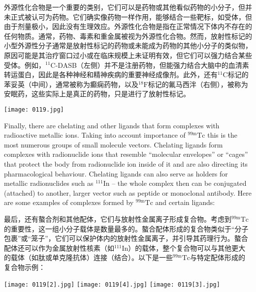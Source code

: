 \documentclass[dvipsnames, svgnames,a4paper,11pt]{article}
\begin{document}
外源性化合物是一个重要的类别，它们可以是药物或其他看似药物的小分子，但并未正式被认可为药物。它们确实像药物一样作用，能够结合一些靶标，如受体，但由于剂量极小，因此没有生理效应。外源性化合物是指在正常情况下体内不存在的任何物质。通常，药物、毒素和重金属被视为外源性化合物。然而，放射性标记的小型外源性分子通常是放射性标记的药物或未能成为药物的其他小分子的类似物，原因可能是其治疗窗口过小或在临床规模上未证明有效，但它们可以强力结合某些受体。例如，${}^{11}\mathrm{C}$-DASB（左侧）并不是注册药物，但能强力结合大脑中的血清素转运蛋白，因此是各种神经和精神疾病的重要神经成像剂。此外，还有${}^{11}\mathrm{C}$标记的苯妥英（中间），通常被称为癫痫药物，以及${}^{18}\mathrm{F}$标记的氟马西泮（右侧），被称为安眠药，这些实际上是真正的药物，只是进行了放射性标记。

\begin{figure*}[h]
	\centering
    \texttt{[image: 0119.jpg]}
\end{figure*}

Finally, there are chelating and other ligands that form complexes with radioactive
metallic ions. Taking into account importance of ${}^\mathrm{99m}\mathrm{Tc}$ this is the most numerous
groups of small molecule vectors. Chelating ligands form complexes with
radionuclide ions that resemble “molecular envelopes” or “cages” that protect the
body from radionuclide ion inside of it and are also directing its pharmacological
behaviour. Chelating ligands can also serve as holders for metallic radionuclides
such as ${}^{111}\mathrm{In}$ – the whole complex then can be conjugated (attached) to another,
larger vector such as peptide or monoclonal antibody. Here are some examples of
complexes formed by ${}^\mathrm{99m}\mathrm{Tc}$ and certain ligands:

最后，还有螯合剂和其他配体，它们与放射性金属离子形成复合物。考虑到${}^\mathrm{99m}\mathrm{Tc}$的重要性，这一组小分子载体是数量最多的。螯合配体形成的复合物类似于“分子包裹”或“笼子”，它们可以保护体内的放射性金属离子，并引导其药理行为。螯合配体还可以作为金属放射性核素（如${}^{111}\mathrm{In}$）的载体，整个复合物可以与其他更大的载体（如肽或单克隆抗体）连接（结合）。以下是一些${}^\mathrm{99m}\mathrm{Tc}$与特定配体形成的复合物示例：

\begin{figure*}[h]
	\centering
    \texttt{[image: 0119[2].jpg]}
    \texttt{[image: 0119[4].jpg]}
    \texttt{[image: 0119[3].jpg]}
\end{figure*}
\end{document}
